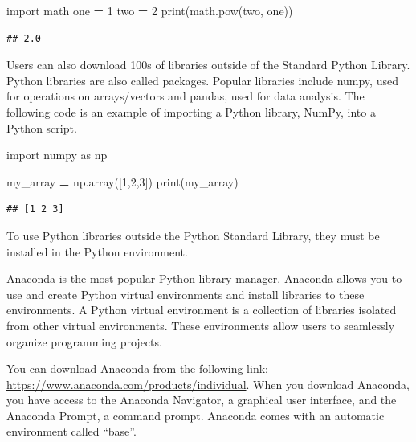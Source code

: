 \documentclass[
]{book}
\newenvironment{Shaded}{\begin{snugshade}}{\end{snugshade}}
\newcommand{\BuiltInTok}[1]{#1}
\newcommand{\DecValTok}[1]{\textcolor[rgb]{0.00,0.00,0.81}{#1}}
\newcommand{\ImportTok}[1]{#1}
\newcommand{\NormalTok}[1]{#1}
\newcommand{\OperatorTok}[1]{\textcolor[rgb]{0.81,0.36,0.00}{\textbf{#1}}}
\begin{document}
\begin{Shaded}
\begin{Highlighting}[]
\ImportTok{import}\NormalTok{ math}
\NormalTok{one }\OperatorTok{=} \DecValTok{1}
\NormalTok{two }\OperatorTok{=} \DecValTok{2}
\BuiltInTok{print}\NormalTok{(math.}\BuiltInTok{pow}\NormalTok{(two, one))}
\end{Highlighting}
\end{Shaded}

\begin{verbatim}
## 2.0
\end{verbatim}

Users can also download 100s of libraries outside of the Standard Python Library. Python libraries are also called packages. Popular libraries include numpy, used for operations on arrays/vectors and pandas, used for data analysis. The following code is an example of importing a Python library, NumPy, into a Python script.

\begin{Shaded}
\begin{Highlighting}[]
\ImportTok{import}\NormalTok{ numpy }\ImportTok{as}\NormalTok{ np}

\NormalTok{my\_array }\OperatorTok{=}\NormalTok{ np.array([}\DecValTok{1}\NormalTok{,}\DecValTok{2}\NormalTok{,}\DecValTok{3}\NormalTok{])}
\BuiltInTok{print}\NormalTok{(my\_array)}
\end{Highlighting}
\end{Shaded}

\begin{verbatim}
## [1 2 3]
\end{verbatim}

To use Python libraries outside the Python Standard Library, they must be installed in the Python environment.

Anaconda is the most popular Python library manager. Anaconda allows you to use and create Python virtual environments and install libraries to these environments. A Python virtual environment is a collection of libraries isolated from other virtual environments. These environments allow users to seamlessly organize programming projects.

You can download Anaconda from the following link: \url{https://www.anaconda.com/products/individual}. When you download Anaconda, you have access to the Anaconda Navigator, a graphical user interface, and the Anaconda Prompt, a command prompt. Anaconda comes with an automatic environment called ``base''.
\end{document}
